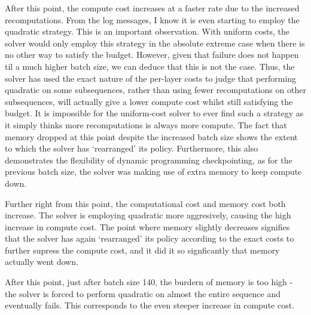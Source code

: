 After this point, the compute cost increases at a faster rate due to the increased recomputations.
From the log messages, I know it is even starting to employ the quadratic strategy.
This is an important observation.
With uniform costs, the solver would only employ this strategy in the absolute extreme case when there is no other way to satisfy the budget.
However, given that failure does not happen til a much higher batch size, we can deduce that this is not the case.
Thus, the solver has used the exact nature of the per-layer costs to judge that performing quadratic on some subsequences, rather than using fewer recomputations on other subsequences, will actually give a lower compute cost whilst still satisfying the budget.
It is impossible for the uniform-cost solver to ever find such a strategy as it simply thinks more recomputations is always more compute.
The fact that memory dropped at this point despite the increased batch size shows the extent to which the solver has `rearranged' its policy.
Furthermore, this also demonstrates the flexibility of dynamic programming checkpointing, as for the previous batch size, the solver was making use of extra memory to keep compute down.

Further right from this point, the computational cost and memory cost both increase.
The solver is employing quadratic more aggresively, causing the high increase in compute cost.
The point where memory slightly decreases signifies that the solver has again `rearranged' its policy according to the exact costs to further supress the compute cost, and it did it so signficantly that memory actually went down.

After this point, just after batch size 140, the burdern of memory is too high - the solver is forced to perform quadratic on almost the entire sequence and eventually fails.
This corresponds to the even steeper increase in compute cost.
